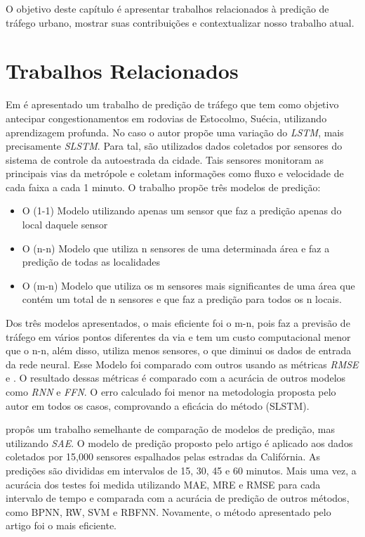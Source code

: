 O objetivo deste capítulo é apresentar trabalhos relacionados à predição de tráfego urbano, mostrar suas contribuições e contextualizar nosso trabalho atual.

\section{Trabalhos Relacionados}
\label{sec:trabalhos_relacionados}

Em  \cite{Zainab_2018} é apresentado um trabalho de predição de tráfego que tem como objetivo antecipar congestionamentos em rodovias de Estocolmo, Suécia, utilizando aprendizagem profunda. No caso o autor propõe uma variação do \textit{\acrshort{LSTM}}, mais precisamente \textit{\acrfull{SLSTM}}. Para tal, são utilizados dados coletados por sensores do sistema de controle da autoestrada da cidade. Tais sensores monitoram as principais vias da metrópole e coletam informações como fluxo e velocidade de cada faixa a cada 1 minuto. O trabalho propõe três modelos de predição:
 
\begin{itemize}
    \item O (1-1) Modelo utilizando apenas um sensor que faz a predição apenas do local daquele sensor
    \item O (n-n) Modelo que utiliza n sensores de uma determinada área e faz a predição de todas as localidades
    \item O (m-n) Modelo que utiliza os m sensores mais significantes de uma área que contém um total de n sensores e que faz a predição para todos os n locais.
\end{itemize}

Dos três modelos apresentados, o mais eficiente foi o m-n, pois faz a previsão de tráfego em vários pontos diferentes da via e tem um custo computacional menor que o n-n, além disso, utiliza menos sensores, o que diminui os dados de entrada da rede neural. Esse Modelo foi comparado com outros usando as métricas \textit{\acrshort{RMSE}} e . O resultado dessas métricas é comparado com a acurácia de outros modelos como \textit{\acrfull{RNN}} e \textit{\acrfull{FFN}}. O erro calculado foi menor na metodologia proposta pelo autor em todos os casos, comprovando a eficácia do método (SLSTM).

\cite{lv_6894591} propôs um trabalho semelhante de comparação de modelos de predição, mas utilizando \textit{\acrfull{SAE}}. O modelo de predição proposto pelo artigo é aplicado aos dados coletados por 15,000 sensores espalhados pelas estradas da Califórnia. As predições são divididas em intervalos de 15, 30, 45 e 60 minutos. Mais uma vez, a acurácia dos testes foi medida utilizando  \acrshort{MAE}, \acrshort{MRE} e \acrshort{RMSE} para cada intervalo de tempo e comparada com a acurácia de predição de outros métodos, como \acrfull{BPNN}, \acrfull{RW}, \acrfull{SVM} e \acrfull{RBFNN}. Novamente, o método apresentado pelo artigo foi o mais eficiente.      

